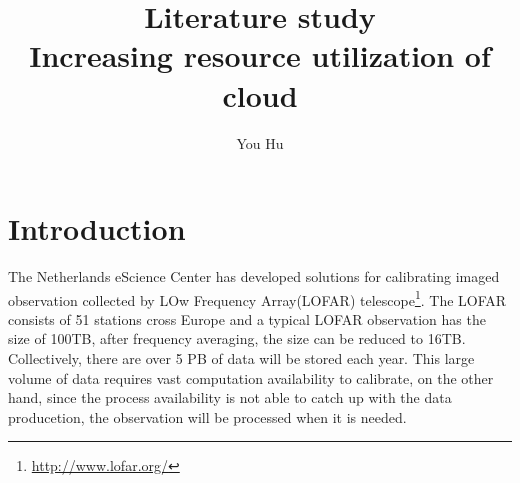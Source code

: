 \documentclass[sigchi]{acmart}
\begin{document}
\title{Literature study \\
       Increasing resource utilization of cloud }

\author{You Hu}



\renewcommand{\shortauthors}{You Hu}






\maketitle

\section{Introduction}
The Netherlands eScience Center has developed solutions for calibrating imaged observation collected by LOw Frequency Array(LOFAR) telescope\footnote{\url{http://www.lofar.org/}}.
The LOFAR consists of 51 stations cross Europe and a typical LOFAR observation has the size of 100TB, after frequency averaging, the size can be reduced to 16TB. \cite{Spreeuw2019}
Collectively, there are over 5 PB of data will be stored each year. \cite{Start2020} 
This large volume of data requires vast computation availability to calibrate, on the other hand, since the process availability is not able to catch up with the data producetion, the observation will be processed when it is needed.
\end{document}
